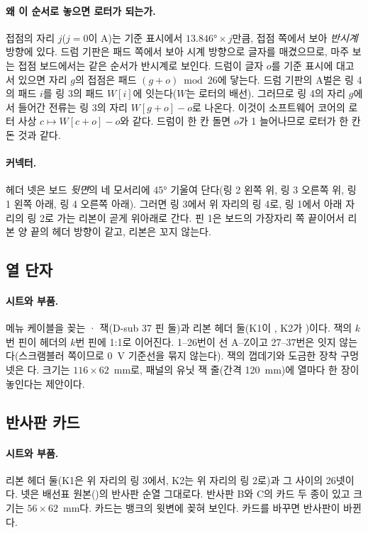 \paragraph{왜 이 순서로 놓으면 로터가 되는가.} 접점의 자리 $j$($j = 0$이 A)는 기준 표시에서 $13.846° \times j$만큼,
접점 쪽에서 보아 \emph{반시계} 방향에 있다. 드럼 기판은 패드 쪽에서 보아 시계 방향으로 글자를 매겼으므로, 마주
보는 접점 보드에서는 같은 순서가 반시계로 보인다. 드럼이 글자 $o$를 기준 표시에 대고 서 있으면 자리 $g$의 접점은
패드 $(g + o) \bmod 26$에 닿는다. 드럼 기판의 A벌은 링 4의 패드 $i$를 링 3의 패드 $W[i]$에 잇는다($W$는 로터의
배선). 그러므로 링 4의 자리 $g$에서 들어간 전류는 링 3의 자리 $W[g+o] - o$로 나온다. 이것이 소프트웨어 코어의
로터 사상 $c \mapsto W[c+o] - o$와 같다. 드럼이 한 칸 돌면 $o$가 1 늘어나므로 로터가 한 칸 돈 것과 같다.

\paragraph{커넥터.} 헤더 넷은 보드 \emph{뒷면}의 네 모서리에 45° 기울여 단다(링 2 왼쪽 위, 링 3 오른쪽 위, 링 1
왼쪽 아래, 링 4 오른쪽 아래). 그러면 링 3에서 위 자리의 링 4로, 링 1에서 아래 자리의 링 2로 가는 리본이 곧게
위아래로 간다. 핀 1은 보드의 가장자리 쪽 끝이어서 리본 양 끝의 헤더 방향이 같고, 리본은 꼬지 않는다.

\subsection{열 단자}

\paragraph{시트와 부품.} 메뉴 케이블을 꽂는 · 잭(D-sub 37 핀 둘)과 리본 헤더 둘(K1이
, K2가 )이다. 잭의 $k$번 핀이 헤더의 $k$번 핀에 1:1로 이어진다. 1--26번이 선 A--Z이고 27--37번은
잇지 않는다(스크램블러 쪽이므로 0~V 기준선을 묶지 않는다). 잭의 껍데기와 도금한 장착 구멍 넷은 다.
크기는 $116 \times 62$~mm로, 패널의 유닛 잭 줄(간격 120~mm)에 열마다 한 장이 놓인다는 제안이다.

\subsection{반사판 카드}

\paragraph{시트와 부품.} 리본 헤더 둘(K1은 위 자리의 링 3에서, K2는 위 자리의 링 2로)과 그 사이의 26넷이다. 넷은
배선표 원본()의 반사판 순열 그대로다. 반사판 B와 C의 카드 두 종이 있고 크기는
$56 \times 62$~mm다. 카드는 뱅크의 윗변에 꽂혀 보인다. 카드를 바꾸면 반사판이 바뀐다.

